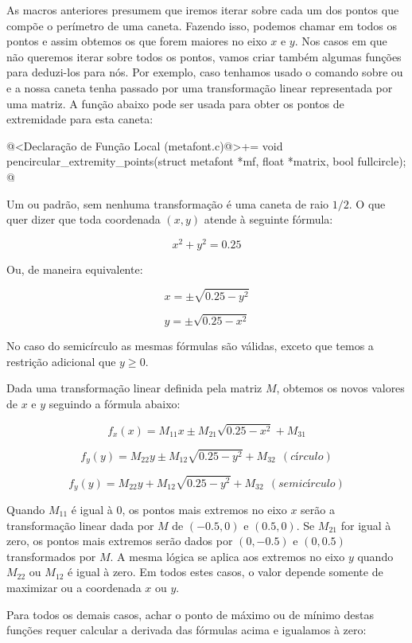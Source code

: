 {{{{{{As macros anteriores presumem que iremos iterar sobre cada um dos
pontos que compõe o perímetro de uma caneta. Fazendo isso, podemos
chamar  em todos os pontos e assim
obtemos os que forem maiores no eixo $x$ e $y$. Nos casos em que não
queremos iterar sobre todos os pontos, vamos criar também algumas
funções para deduzi-los para nós. Por exemplo, caso tenhamos usado o
comando  sobre 
ou  e a nossa caneta tenha passado por uma
transformação linear representada por uma matriz. A função abaixo pode
ser usada para obter os pontos de extremidade para esta caneta:

\iniciocodigo
@<Declaração de Função Local (metafont.c)@>+=
void pencircular_extremity_points(struct metafont *mf, float *matrix,
                                  bool fullcircle);
@
\fimcodigo

Um  ou  padrão, sem
nenhuma transformação é uma caneta de raio $1/2$. O que quer
dizer que toda coordenada $(x,y)$ atende à seguinte fórmula:

$$
x^2+y^2= 0.25
$$

Ou, de maneira equivalente:

$$
x=\pm\sqrt{0.25-y^2}
$$

$$
y=\pm\sqrt{0.25-x^2}
$$

No caso do semicírculo as mesmas fórmulas são válidas, exceto que
temos a restrição adicional que $y\geq 0$.

Dada uma transformação linear definida pela matriz $M$, obtemos os novos
valores de $x$ e $y$ seguindo a fórmula abaixo:

$$
f_x(x) = M_{11}x \pm M_{21}\sqrt{0.25-x^2} + M_{31}
$$

$$
f_y(y) = M_{22}y \pm M_{12}\sqrt{0.25-y^2} + M_{32}\ \ (círculo)
$$

$$
f_y(y) = M_{22}y + M_{12}\sqrt{0.25-y^2} + M_{32}\ \ (semicírculo)
$$


Quando $M_{11}$ é igual à 0, os pontos mais extremos no eixo $x$ serão
a transformação linear dada por $M$ de $(-0.5, 0)$ e $(0.5, 0)$. Se
$M_{21}$ for igual à zero, os pontos mais extremos serão dados por
$(0, -0.5)$ e $(0, 0.5)$ transformados por $M$. A mesma lógica se
aplica aos extremos no eixo $y$ quando $M_{22}$ ou $M_{12}$ é igual à
zero. Em todos estes casos, o valor depende somente de maximizar ou a
coordenada $x$ ou $y$.

Para todos os demais casos, achar o ponto de máximo ou de mínimo
destas funções requer calcular a derivada das fórmulas acima e
igualamos à zero:

}}}}}}

